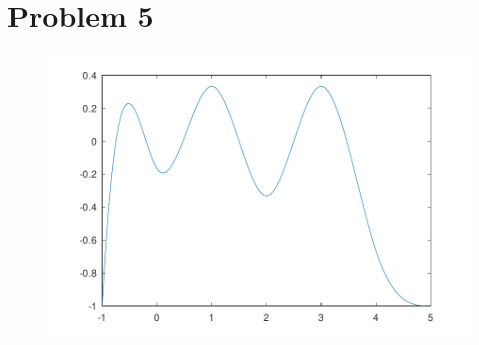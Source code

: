 \documentclass{article}
\begin{document}
\section*{Problem 5}

\begin{figure}
    \centering
    \includegraphics[width=\linewidth]{figures/plotSplineCurve.pdf}
    \caption{}
\end{figure}
\end{document}
